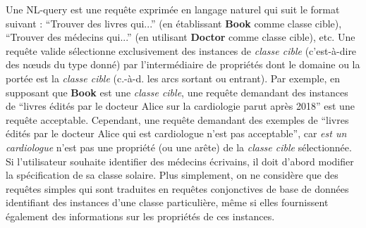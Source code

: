 \begin{definition}[NL-query]
    Une NL-query est une requête exprimée en langage naturel qui suit le format suivant : \enquote{Trouver des livres qui...} (en établissant \textbf{Book} comme classe cible), \enquote{Trouver des médecins qui...} (en utilisant \textbf{Doctor} comme classe cible), etc.
    Une requête valide sélectionne exclusivement des instances de  \emph{classe cible} (c'est-à-dire des nœuds du type donné) par l'intermédiaire de propriétés dont le domaine ou la portée est la \emph{classe cible} (c.-à-d. les arcs sortant ou entrant).
    Par exemple, en supposant que \textbf{Book} est une \emph{classe cible}, une requête demandant des instances de \enquote{livres édités par le docteur Alice sur la cardiologie parut après 2018} est une requête acceptable.
    Cependant, une requête demandant des exemples de \enquote{livres édités par le docteur Alice qui est cardiologue n'est pas acceptable}, car \emph{est un cardiologue} n'est pas une propriété (ou une arête) de la \emph{classe cible} sélectionnée.
    Si l'utilisateur souhaite identifier des médecins écrivains, il doit d'abord modifier la spécification de sa classe solaire.
    Plus simplement, on ne considère que des requêtes simples qui sont traduites en requêtes conjonctives de base de données identifiant des instances d'une classe particulière, même si elles fournissent également des informations sur les propriétés de ces instances.
\end{definition}

